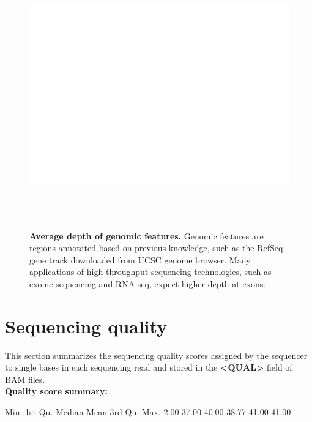 \documentclass{article}
\begin{document}
\begin{center}
\begin{figure}[H]
\includegraphics[width=6.5in, height=4.5in, page=2]{bamchop-depth-feature}
\caption{\textbf{Average depth of genomic features.} Genomic features are regions annotated based on previous knowledge, such as the RefSeq gene track downloaded from UCSC genome browser. Many applications of high-throughput sequencing technologies, such as exome sequencing and RNA-seq, expect higher depth at exons.}
\end{figure}
\end{center}

\pagebreak

\section{Sequencing quality}
This section summarizes the sequencing quality scores assigned by the sequencer to single bases in each sequencing read and stored in the \textbf{<QUAL>} field of BAM files.
\vspace*{1\baselineskip}
\\{\textbf{Quality score summary:}}
\begin{Schunk}
\begin{Soutput}
   Min. 1st Qu.  Median    Mean 3rd Qu.    Max. 
   2.00   37.00   40.00   38.77   41.00   41.00 
\end{Soutput}
\end{Schunk}
\end{document}
